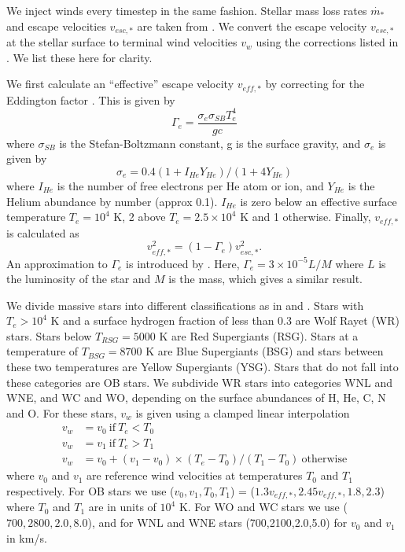 \documentclass[a4paper,fleqn,usenatbib]{mnras}
\begin{document}
We inject winds every timestep in the same fashion. Stellar mass loss rates $\dot{m_*}$ and escape velocities $v_{esc,*}$ are taken from \citet{Ekstrom2012}. We convert the escape velocity $v_{esc,*}$ at the stellar surface to terminal wind velocities $v_w$ using the corrections listed in \citet{Gatto2017}. We list these here for clarity.

We first calculate an ``effective'' escape velocity $v_{eff,*}$ by correcting for the Eddington factor \citep[e.g.][]{Vink2011}. This is given by
\begin{equation}
\Gamma_e = \frac{\sigma_e \sigma_{SB} T_e^4}{g c}
\end{equation}
where $\sigma_{SB}$ is the Stefan-Boltzmann constant, g is the surface gravity, and $\sigma_e$ is given by
\begin{equation}
\sigma_{e}= 0.4 (1 + I_{He}Y_{He}) / (1 + 4 Y_{He})
\end{equation}
where $I_{He}$ is the number of free electrons per He atom or ion, and $Y_{He}$  is the Helium abundance by number (approx 0.1). $I_{He}$ is zero below an effective surface temperature $T_e = 10^4$ K, 2 above $T_e = 2.5\times10^4$ K and 1 otherwise. Finally, $v_{eff,*}$ is calculated as
\begin{equation}
v_{eff,*}^2  =  (1 - \Gamma_e) v_{esc,*}^2.
\end{equation}
An approximation to $\Gamma_e$ is introduced by \citet{Vink2011}. Here, $\Gamma_e = 3\times10^{-5} L / M$ where $L$ is the luminosity of the star and $M$ is the mass, which gives a similar result.

We divide massive stars into different classifications as in \citet{Crowther2007} and \citet{Georgy2012}. Stars with $T_e > 10^4$ K and a surface hydrogen fraction of less than 0.3 are Wolf Rayet (WR) stars. Stars below $T_{RSG} = 5000$ K are Red Supergiants (RSG). Stars at a temperature of $T_{BSG} = 8700$ K are Blue Supergiants (BSG) and stars between these two temperatures are Yellow Supergiants (YSG). Stars that do not fall into these categories are OB stars. We subdivide WR stars into categories WNL and WNE, and WC and WO, depending on the surface abundances of H, He, C, N and O. For these stars, $v_w$ is given using a clamped linear interpolation
\begin{equation}
\begin{aligned}
v_w &= v_0 \mathrm{~if~} T_e < T_0 \\
v_w &= v_1 \mathrm{~if~} T_e > T_1 \\
v_w &= v_0 + (v_1 - v_0) \times (T_e - T_0) / (T_1 - T_0) \mathrm{~otherwise}
\label{kwind}
\end{aligned}
\end{equation}
where $v_0$ and $v_1$ are reference wind velocities at temperatures $T_0$ and $T_1$ respectively. For OB stars we use ($v_0,v_1,T_0,T_1$) = ($1.3 v_{eff,*},2.45 v_{eff,*},1.8,2.3$) where $T_0$ and $T_1$ are in units of $10^4$ K. For WO and WC stars we use ($700,2800,2.0,8.0$), and for WNL and WNE stars (700,2100,2.0,5.0) for $v_0$ and $v_1$ in km/s.
\end{document}
